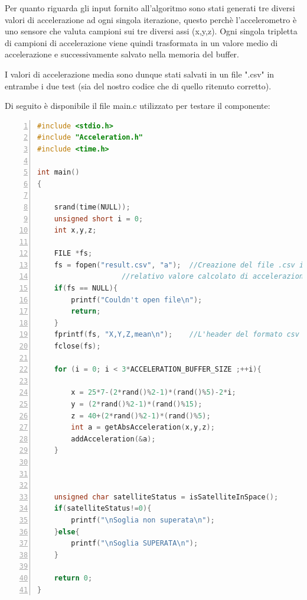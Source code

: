 \documentclass[LaM,binding=0.6cm,oneside]{../sapthesis}
\begin{document}
Per quanto riguarda gli input fornito all'algoritmo sono stati generati tre diversi valori di accelerazione ad ogni singola iterazione, questo perchè l'accelerometro è uno sensore che valuta campioni sui tre diversi assi (x,y,z).
Ogni singola tripletta di campioni di accelerazione viene quindi trasformata in un valore medio di accelerazione e successivamente salvato nella memoria del buffer.

I valori di accelerazione media sono dunque stati salvati in un file ".csv" in entrambe i due test (sia del nostro codice che di quello ritenuto corretto).

Di seguito è disponibile il file main.c utilizzato per testare il componente:

\begin{lstlisting}[language=C,
                   basicstyle=\scriptsize,
                   numbers=left,
                   stepnumber=0,
                   numbersep=4pt,
                   tabsize=2,
                   showspaces=false,
                   showstringspaces=false]
#include <stdio.h>
#include "Acceleration.h"
#include <time.h>

int main()
{
    
    srand(time(NULL));
    unsigned short i = 0;
    int x,y,z;
    
    FILE *fs;
    fs = fopen("result.csv", "a");	//Creazione del file .csv in cui salvare i valori di accelerazione e 
					//relativo valore calcolato di accelerazione media
	if(fs == NULL){
	    printf("Couldn't open file\n");
	    return;
	}
	fprintf(fs, "X,Y,Z,mean\n");	//L'header del formato csv
    fclose(fs);
	
    for (i = 0; i < 3*ACCELERATION_BUFFER_SIZE ;++i){
	
    	x = 25*7-(2*rand()%2-1)*(rand()%5)-2*i;
    	y = (2*rand()%2-1)*(rand()%15);
    	z = 40+(2*rand()%2-1)*(rand()%5);
        int a = getAbsAcceleration(x,y,z);
        addAcceleration(&a);
    }    
	
	

    unsigned char satelliteStatus = isSatelliteInSpace();
    if(satelliteStatus!=0){
        printf("\nSoglia non superata\n");
    }else{
        printf("\nSoglia SUPERATA\n");
    }

    return 0;
}
\end{lstlisting}
\end{document}
